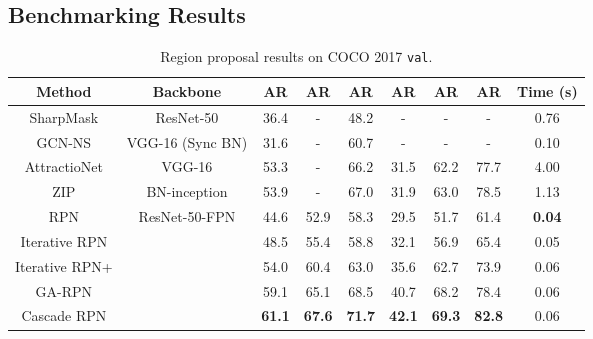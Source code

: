 \documentclass{article}
\begin{document}
	\subsection{Benchmarking Results}
	\begin{table}[t]
		\small
		\centering
		\caption{Region proposal results on COCO 2017 \texttt{val}.}
		\begin{tabular}{ccccccccc}\toprule[1pt]
			Method       & Backbone         & AR   & AR & AR   & AR   & AR   & AR   & Time (s) \\ \midrule[0.5pt]
			SharpMask \citep{pinheiro2016learning}      & ResNet-50                       & 36.4 & -    & 48.2 & -    & -    & -    & 0.76 \\
			GCN-NS \citep{lu2018toward}        & VGG-16 (Sync BN)                & 31.6 & -    & 60.7 & -    & -    & -    & 0.10 \\
			AttractioNet \citep{gidaris2016attend}  & VGG-16                          & 53.3 & -    & 66.2 & 31.5 & 62.2 & 77.7 & 4.00 \\
			ZIP \citep{li2019zoom}           & BN-inception                    & 53.9 & -    & 67.0 & 31.9 & 63.0 & 78.5 & 1.13 \\ \midrule[0.5pt]
			RPN \citep{NIPS2015_5638}           & \multirow{5}{*}{ResNet-50-FPN}  & 44.6 & 52.9 & 58.3 & 29.5 & 51.7 & 61.4 & \textbf{0.04} \\
			Iterative RPN  &                                 & 48.5 & 55.4 & 58.8 & 32.1 & 56.9 & 65.4 & 0.05 \\
			Iterative RPN+ &                                 & 54.0 & 60.4 & 63.0 & 35.6 & 62.7 & 73.9 & 0.06 \\
			GA-RPN \citep{wang2019region}        &                                 & 59.1 & 65.1 & 68.5 & 40.7 & 68.2 & 78.4 & 0.06 \\
			Cascade RPN    &                                 & \textbf{61.1} & \textbf{67.6} & \textbf{71.7} & \textbf{42.1} & \textbf{69.3} & \textbf{82.8} & 0.06 \\ 
			\bottomrule[1pt]
		\end{tabular}
		\label{tab:region_proposal_benchmark}
	\end{table}
	
\end{document}
